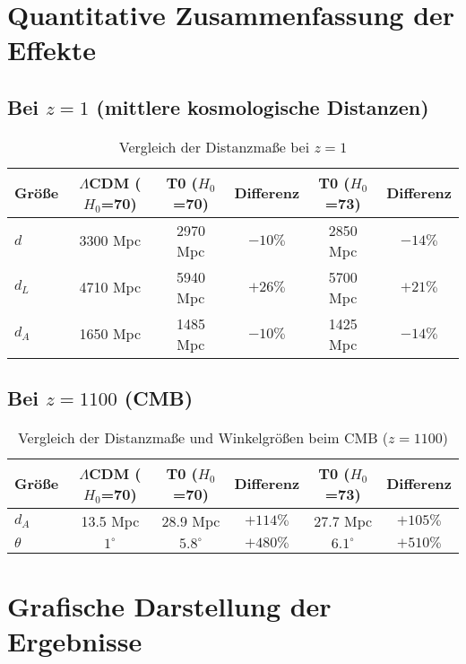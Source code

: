 \documentclass[a4paper,12pt]{article}
\theoremstyle{definition}
\theoremstyle{remark}
\begin{document}
	\section{Quantitative Zusammenfassung der Effekte}
	
	\subsection{Bei $z = 1$ (mittlere kosmologische Distanzen)}
	
	\begin{table}[h]
		\centering
		\begin{tabular}{|l|c|c|c|c|c|}
			\hline
			\textbf{Größe} & \textbf{$\Lambda$CDM ($H_0$=70)} & \textbf{T0 ($H_0$=70)} & \textbf{Differenz} & \textbf{T0 ($H_0$=73)} & \textbf{Differenz} \\
			\hline
			$d$ & 3300 Mpc & 2970 Mpc & $-10\%$ & 2850 Mpc & $-14\%$ \\
			$d_L$ & 4710 Mpc & 5940 Mpc & $+26\%$ & 5700 Mpc & $+21\%$ \\
			$d_A$ & 1650 Mpc & 1485 Mpc & $-10\%$ & 1425 Mpc & $-14\%$ \\
			\hline
		\end{tabular}
		\caption{Vergleich der Distanzmaße bei $z = 1$}
	\end{table}
	
	\subsection{Bei $z = 1100$ (CMB)}
	
	\begin{table}[h]
		\centering
		\begin{tabular}{|l|c|c|c|c|c|}
			\hline
			\textbf{Größe} & \textbf{$\Lambda$CDM ($H_0$=70)} & \textbf{T0 ($H_0$=70)} & \textbf{Differenz} & \textbf{T0 ($H_0$=73)} & \textbf{Differenz} \\
			\hline
			$d_A$ & 13.5 Mpc & 28.9 Mpc & $+114\%$ & 27.7 Mpc & $+105\%$ \\
			$\theta$ & $1^\circ$ & $5.8^\circ$ & $+480\%$ & $6.1^\circ$ & $+510\%$ \\
			\hline
		\end{tabular}
		\caption{Vergleich der Distanzmaße und Winkelgrößen beim CMB ($z = 1100$)}
	\end{table}
	
	\section{Grafische Darstellung der Ergebnisse}
	
\end{document}

